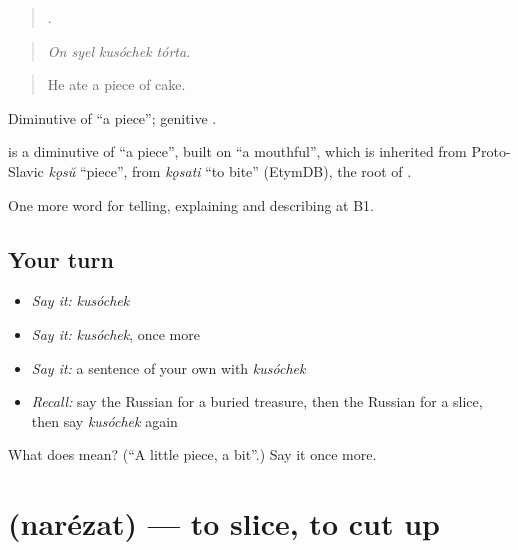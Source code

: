 \begin{quote}
   .
\end{quote}

\begin{quote}
\emph{On syel kusóchek tórta.}
\end{quote}

\begin{quote}
He ate a piece of cake.
\end{quote}

Diminutive of \emph{} \textquotedblleft{}a piece\textquotedblright{}; genitive \emph{}.

\begin{cousinweb}
\emph{} is a diminutive of \emph{} \textquotedblleft{}a piece\textquotedblright{}, built on \emph{} \textquotedblleft{}a mouthful\textquotedblright{}, which is inherited from Proto-Slavic \emph{kǫsŭ} \textquotedblleft{}piece\textquotedblright{}, from \emph{kǫsati} \textquotedblleft{}to bite\textquotedblright{} (EtymDB), the root of \emph{}.
\end{cousinweb}

\begin{grammarlens}[title={What you've built}]
One more word for telling, explaining and describing at B1.
\end{grammarlens}

\subsection*{Your turn}
\begin{itemize}
\raggedright
  \item \emph{Say it:} \emph{kusóchek}
  \item \emph{Say it:} \emph{kusóchek}, once more
  \item \emph{Say it:} a sentence of your own with \emph{kusóchek}
  \item \emph{Recall:} say the Russian for a buried treasure, then the Russian for a slice, then say \emph{kusóchek} again
\end{itemize}

\begin{tcolorbox}[breakable,colback=teal!4,colframe=teal!35!black,title={Before you move on}]
What does  mean? (\textquotedblleft{}A little piece, a bit\textquotedblright{}.) Say it once more.
\end{tcolorbox}
\section[\texorpdfstring{\ru{нарезать} (narézat)}{нарезать (narézat)}]{ (narézat) — to slice, to cut up}

